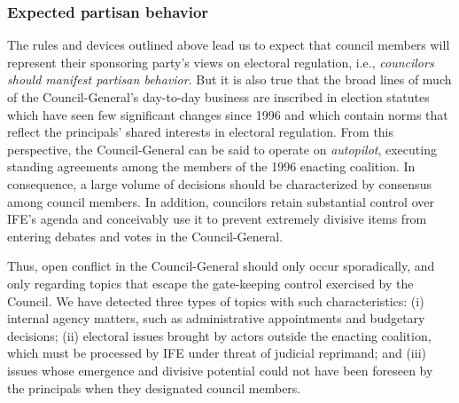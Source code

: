 \documentclass[12 pt, letter]{article}
\begin{document}
\subsubsection{Expected partisan behavior}
The rules and devices outlined above lead us to expect that council
members will represent their sponsoring party's views on electoral
regulation, i.e., \emph{councilors should manifest partisan
behavior}.  But it is also true that the broad lines of much of the
Council-General's day-to-day business are inscribed in election
statutes which have seen few significant changes since 1996 and
which contain norms that reflect the principals' shared interests in
electoral regulation.  From this perspective, the Council-General
can be said to operate on \emph{autopilot}, executing standing
agreements among the members of the 1996 enacting coalition.  In
consequence, a large volume of decisions should be characterized by
consensus among council members.  In addition, councilors retain
substantial control over IFE's agenda and conceivably use it to
prevent extremely divisive items from entering debates and votes in
the Council-General.

Thus, open conflict in the Council-General should only occur
sporadically, and only regarding topics that escape the gate-keeping
control exercised by the Council. We have detected three types of
topics with such characteristics: (i) internal agency matters, such
as administrative appointments and budgetary decisions; (ii)
electoral issues brought by actors outside the enacting coalition,
which must be processed by IFE under threat of judicial reprimand;
and (iii) issues whose emergence and divisive potential could not
have been foreseen by the principals when they designated council
members.
\end{document}
